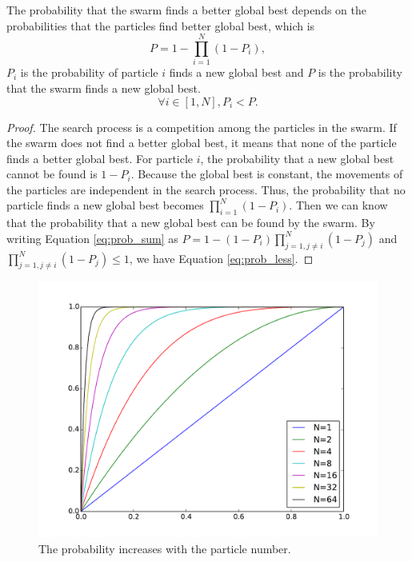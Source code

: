 \begin{mythm}
\label{thm:nonsingleHill:swarm:prob}
The probability that the swarm finds a better global best depends on the probabilities that the particles find better global best, which is
\begin{equation}
\label{eq:prob_sum}
P = 1 - \prod_{i=1}^{N} ( 1 - P_{i} ),
\end{equation}
$ P_{i} $ is the probability of particle $ i $ finds a new global best
and $ P $ is the probability that the swarm finds a new global best.
\begin{equation}
\label{eq:prob_less}
\forall i \in [1, N], P_{i} < P.
\end{equation}
\begin{proof}
The search process is a competition among the particles in the swarm.
If the swarm does not find a better global best, it means that none of the particle finds a better global best.
For particle $ i $, the probability that a new global best cannot be found is $ 1 - P_{i} $.
Because the global best is constant, the movements of the particles are independent in the search process.
Thus, the probability that no particle finds a new global best becomes
$ \prod_{i=1}^{N} ( 1 - P_{i} ) $.
Then we can know that the probability that a new global best can be found by the swarm.
By writing Equation \ref{eq:prob_sum} as $ P = 1 - ( 1 - P_{i} ) \prod_{j=1, j \not = i}^{N}  ( 1 - P_{j} ) $ and $ \prod_{j=1, j \not = i}^{N}  ( 1 - P_{j} ) \leq 1 $,
we have Equation \ref{eq:prob_less}.
\end{proof}
\end{mythm}

\begin{figure}
\centering
\includegraphics[width=0.7\linewidth]{./fig/probRise}
\caption{The probability increases with the particle number.}
\label{fig:probRise}
\end{figure}

